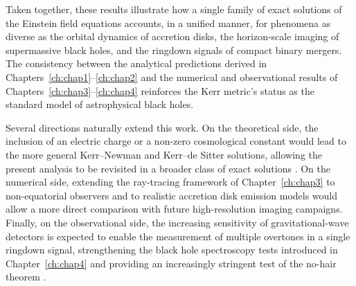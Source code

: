 Taken together, these results illustrate how a single family of exact solutions of the Einstein field equations accounts, in a unified manner, for phenomena as diverse as the orbital dynamics of accretion disks, the horizon-scale imaging of supermassive black holes, and the ringdown signals of compact binary mergers. The consistency between the analytical predictions derived in Chapters~\ref{ch:chap1}--\ref{ch:chap2} and the numerical and observational results of Chapters~\ref{ch:chap3}--\ref{ch:chap4} reinforces the Kerr metric's status as the standard model of astrophysical black holes.

Several directions naturally extend this work. On the theoretical side, the inclusion of an electric charge or a non-zero cosmological constant would lead to the more general Kerr--Newman and Kerr--de Sitter solutions, allowing the present analysis to be revisited in a broader class of exact solutions \cite{newman1965}. On the numerical side, extending the ray-tracing framework of Chapter~\ref{ch:chap3} to non-equatorial observers and to realistic accretion disk emission models would allow a more direct comparison with future high-resolution imaging campaigns. Finally, on the observational side, the increasing sensitivity of gravitational-wave detectors is expected to enable the measurement of multiple overtones in a single ringdown signal, strengthening the black hole spectroscopy tests introduced in Chapter~\ref{ch:chap4} and providing an increasingly stringent test of the no-hair theorem \cite{berti2009}.

\perfectdivider
